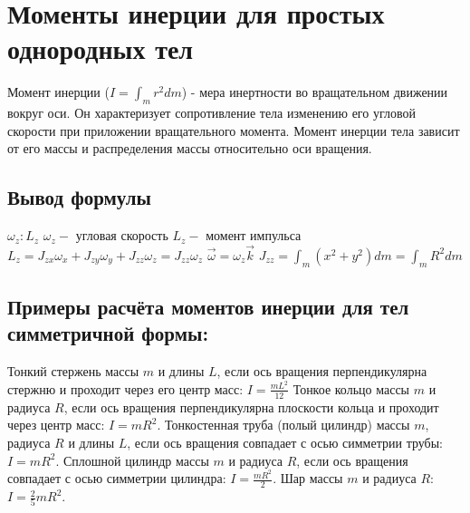 \documentclass[a4paper]{article}
\begin{document}
	
	\section{Моменты инерции для простых однородных тел} 
	\begin{flushleft}
	Момент инерции ($I = \int_m r^2 dm$) - мера инертности во вращательном движении вокруг оси. Он характеризует сопротивление тела изменению его угловой скорости при приложении вращательного момента. \linebreak
	Момент инерции тела зависит от его массы и распределения массы относительно оси вращения.  \linebreak
\end{flushleft}
\subsection*{Вывод формулы}
\begin{flushleft}
	$\omega_z : L_z$ \linebreak
	$\omega_z -$ угловая скорость\linebreak
	$L_z -$ момент импульса \linebreak
	$L_z = J_{zx} \omega_x + J_{zy} \omega_y + J_{zz} \omega_z =  J_{zz} \omega_z$ \linebreak
	$ \vec{\omega} = \omega_z  \vec{k}$ \linebreak
	$J_{zz} = \int_m (x^2 + y ^ 2)dm = \int_m R^2 dm$
\end{flushleft}

	\subsection*{Примеры расчёта моментов инерции для тел симметричной формы:}
	\begin{flushleft}
		Тонкий стержень массы $m$ и длины $L$, если ось вращения перпендикулярна стержню и проходит через его центр масс: $I = \frac{mL^2}{12}$ 
		\linebreak \linebreak
		Тонкое кольцо массы $m$ и радиуса $R$, если ось вращения перпендикулярна плоскости кольца и проходит через центр масс: $I = mR^2$.
		\linebreak \linebreak
		Тонкостенная труба (полый цилиндр) массы $m$, радиуса $R$ и длины $L$, если ось вращения совпадает с осью симметрии трубы: $I = mR^2$.
		\linebreak \linebreak
		Сплошной цилиндр массы $m$ и радиуса $R$, если ось вращения совпадает с осью симметрии цилиндра: $I = \frac{mR^2}{2}$.
		\linebreak \linebreak
		Шар массы $m$ и радиуса $R$: $I = \frac{2}{5}mR^2$.
		
	\end{flushleft}
\end{document}
